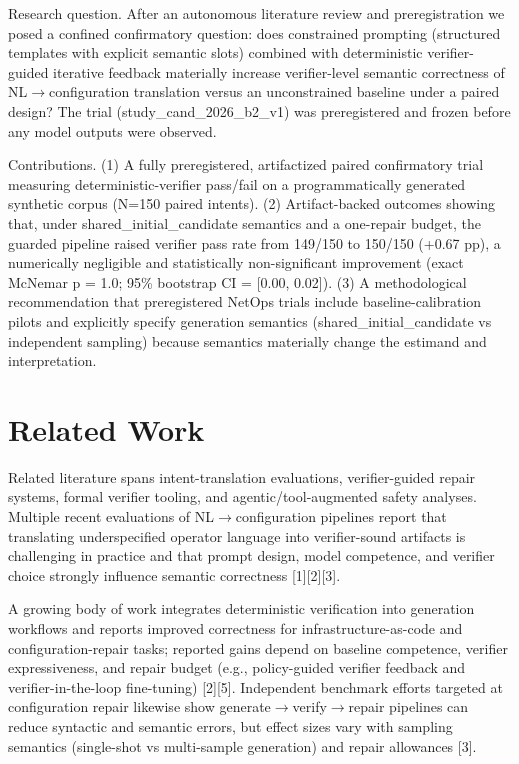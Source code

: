 \documentclass[conference]{IEEEtran}
\begin{document}
Research question. After an autonomous literature review and preregistration we posed a confined confirmatory question: does constrained prompting (structured templates with explicit semantic slots) combined with deterministic verifier-guided iterative feedback materially increase verifier-level semantic correctness of NL\ensuremath{\rightarrow}configuration translation versus an unconstrained baseline under a paired design? The trial (study\_cand\_2026\_b2\_v1) was preregistered and frozen before any model outputs were observed.

Contributions. (1) A fully preregistered, artifactized paired confirmatory trial measuring deterministic-verifier pass/fail on a programmatically generated synthetic corpus (N=150 paired intents). (2) Artifact-backed outcomes showing that, under shared\_initial\_candidate semantics and a one-repair budget, the guarded pipeline raised verifier pass rate from 149/150 to 150/150 (+0.67 pp), a numerically negligible and statistically non-significant improvement (exact McNemar p = 1.0; 95\% bootstrap CI = [0.00, 0.02]). (3) A methodological recommendation that preregistered NetOps trials include baseline-calibration pilots and explicitly specify generation semantics (shared\_initial\_candidate vs independent sampling) because semantics materially change the estimand and interpretation.

\section{Related Work}
Related literature spans intent-translation evaluations, verifier-guided repair systems, formal verifier tooling, and agentic/tool-augmented safety analyses. Multiple recent evaluations of NL\ensuremath{\rightarrow}configuration pipelines report that translating underspecified operator language into verifier-sound artifacts is challenging in practice and that prompt design, model competence, and verifier choice strongly influence semantic correctness [1][2][3].

A growing body of work integrates deterministic verification into generation workflows and reports improved correctness for infrastructure-as-code and configuration-repair tasks; reported gains depend on baseline competence, verifier expressiveness, and repair budget (e.g., policy-guided verifier feedback and verifier-in-the-loop fine-tuning) [2][5]. Independent benchmark efforts targeted at configuration repair likewise show generate\ensuremath{\rightarrow}verify\ensuremath{\rightarrow}repair pipelines can reduce syntactic and semantic errors, but effect sizes vary with sampling semantics (single-shot vs multi-sample generation) and repair allowances [3].
\end{document}
